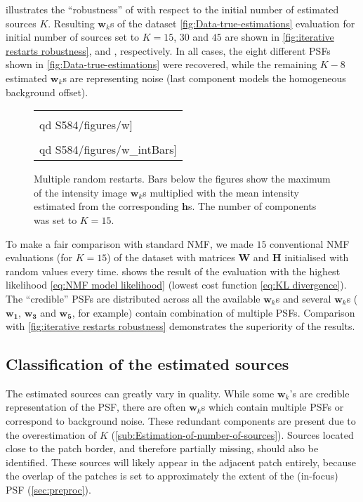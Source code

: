  illustrates the ``robustness'' of \inmf{} with respect to the initial number of estimated sources $K$. Resulting $\bm{w}_k$s of the dataset \autoref{fig:Data-true-estimations}\aaa{} evaluation for initial number of sources set to $K=15$, $30$ and $45$ are shown in \autoref{fig:iterative restarts robustness}\aaa,\bbb{} and \ccc, respectively. In all cases, the eight different PSFs shown in \autoref{fig:Data-true-estimations}\bbb{} were recovered, while the remaining $K-8$ estimated $\bm{w}_k$s are representing noise (last component models the homogeneous background offset).

\begin{figure}[!htb]
	\newcommand{\widthfig}{.95\textwidth}
	\newcommand{\barspace}{-.7cm}
	\centering
	\begin{tabular}{l}
		\texttt{[image: \\qd S584/figures/w]} \vspace{\barspace}\tabularnewline
		\texttt{[image: \\qd S584/figures/w\_intBars]}\tabularnewline
	\end{tabular}
	\caption{Multiple random restarts. Bars below the figures show the maximum of the intensity image $\bm{w}_k$s multiplied with the mean intensity estimated from the corresponding $\bm{h}$s. The number of components was set to $K=15$.}
	\label{fig:random restarts}
\end{figure}

To make a fair comparison with standard NMF, we made $15$ conventional NMF evaluations (for $K=15$) of the dataset with matrices $\bm{W}$ and $\bm{H}$ initialised with random values every time.  shows the result of the evaluation with the highest likelihood \autoref{eq:NMF model likelihood} (lowest cost function \autoref{eq:KL divergence}). The ``credible'' PSFs are distributed across all the available $\bm{w}_k$s and several $\bm{w}_k$s ($\bm{w_1}$, $\bm{w_3}$ and $\bm{w_5}$, for example) contain combination of multiple PSFs. Comparison with \autoref{fig:iterative restarts robustness}\aaa{} demonstrates the superiority of the \inmf{} results. 


\subsection{Classification of the estimated sources\label{sub:Classification-of-sources}}

The estimated sources can greatly vary in quality. While some $\bm{w}_k$'s are credible representation of the PSF, there are often $\bm{w}_k$s which contain multiple PSFs or correspond to background noise. These redundant components are present due to the overestimation of $K$ (\autoref{sub:Estimation-of-number-of-sources}). Sources located close to the patch border, and therefore partially missing, should also be identified. These sources will likely appear in the adjacent patch entirely, because the overlap of the patches is set to approximately the extent of the (in-focus) PSF (\autoref{sec:preproc}).

